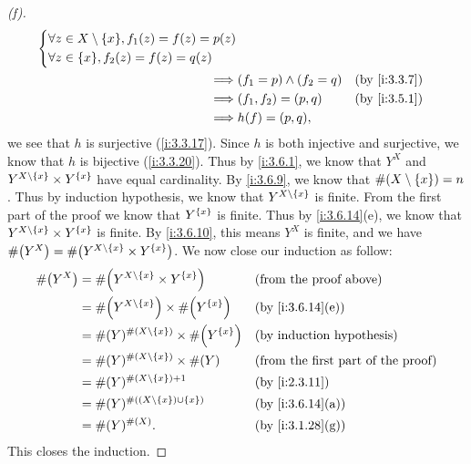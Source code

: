 \begin{proof}[(f)]
\begin{align*}
\begin{dcases}
                 \forall z \in X \setminus \set{x}, f_1(z) = f(z) = p(z) \\
                 \forall z \in \set{x}, f_2(z) = f(z) = q(z)
               \end{dcases}                      \\
    \implies & (f_1 = p) \land (f_2 = q)                                  &  & \by{i:3.3.7} \\
    \implies & (f_1, f_2) = (p, q)                                        &  & \by{i:3.5.1} \\
    \implies & h(f) = (p, q),
  \end{align*}
  we see that \(h\) is surjective (\cref{i:3.3.17}).
  Since \(h\) is both injective and surjective, we know that \(h\) is bijective (\cref{i:3.3.20}).
  Thus by \cref{i:3.6.1}, we know that \(Y^X\) and \(Y^{X \setminus \left\lbrace x\right\rbrace} \times Y^{\left\lbrace x\right\rbrace}\) have equal cardinality.
  By \cref{i:3.6.9}, we know that \(\#(X \setminus \left\lbrace x\right\rbrace) = n\).
  Thus by induction hypothesis, we know that \(Y^{X \setminus \left\lbrace x\right\rbrace}\) is finite.
  From the first part of the proof we know that \(Y^{\left\lbrace x\right\rbrace}\) is finite.
  Thus by \cref{i:3.6.14}(e), we know that \(Y^{X \setminus \left\lbrace x\right\rbrace} \times Y^{\left\lbrace x\right\rbrace}\) is finite.
  By \cref{i:3.6.10}, this means \(Y^X\) is finite, and we have \(\#\pa{Y^X} = \#\pa{Y^{X \setminus \set{x}} \times Y^{\set{x}}}\).
  We now close our induction as follow:
  \begin{align*}
    \#\pa{Y^X} & = \#\pa{Y^{X \setminus \set{x}} \times Y^{\set{x}}}         &  & \text{(from the proof above)}             \\
               & = \#\pa{Y^{X \setminus \set{x}}} \times \#\pa{Y^{\set{x}}}  &  & \by{i:3.6.14}[e]                          \\
               & = \#(Y)^{\#(X \setminus \set{x})} \times \#\pa{Y^{\set{x}}} &  & \byIH                                     \\
               & = \#(Y)^{\#(X \setminus \set{x})} \times \#(Y)              &  & \text{(from the first part of the proof)} \\
               & = \#(Y)^{\#(X \setminus \set{x}) + 1}                       &  & \by{i:2.3.11}                             \\
               & = \#(Y)^{\#((X \setminus \set{x}) \cup \set{x})}            &  & \by{i:3.6.14}[a]                          \\
               & = \#(Y)^{\#(X)}.                                            &  & \by{i:3.1.28}[g]
  \end{align*}
  This closes the induction.
\end{proof}

